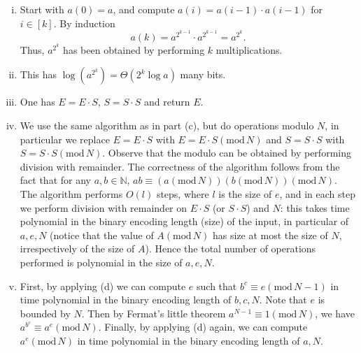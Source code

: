 \documentclass[11pt]{article}
\newcommand{\setN}{\mathbb{N}}
\begin{document}
\begin{enumerate}[1)]
\begin{solution}
\begin{enumerate}[i)]
\item Start with $a(0) = a$, and compute $a(i) = a(i− 1)· a(i− 1)$ for $i ∈ [k]$. By induction
$$a(k) = a^{2^{k−1}}· a^{2^{k−1}} = a^{2^k}.$$
Thus, $a^{2^k}$ has been obtained by performing $k$ multiplications.
\item  This has $\log(a^{2^k}) = Θ(2^k \log a)$ many bits.
\item One has $E = E\cdot S$, $S = S\cdot S$ and return $E$.
\item We use the same algorithm as in part (c), but do operations modulo $N$, in particular we replace $E
= E\cdot S$ with $E = E\cdot S (\text{mod}\, N)$ and $S = S\cdot S$ with $S = S\cdot S (\text{mod}\, N)$. Observe that the modulo can be obtained by performing division with remainder. 
The correctness of the algorithm follows from the fact that for any $a, b ∈ \setN$, $ab ≡ (a (\text{mod}\, N))(b (\text{mod}\, N)) (\text{mod}\, N)$. The algorithm performs
$O(l)$ steps, where $l$ is the size of $e$, and in each step we perform division with remainder on
$E \cdot S$ (or $S \cdot S$) and $N$: this takes time polynomial in the binary encoding length (size) of the
input, in particular of $a, e, N$ (notice that the value of $A (\text{mod}\, N)$ has size at most the size of $N$,
irrespectively of the size of $A$). Hence the total number of operations performed is polynomial
in the size of $a, e, N$.
\item  

First, by applying (d) we can compute $e$ such that $b^c \equiv e (\text{mod}\, N-1)$ in time polynomial in the binary encoding length of $b,c,N$. 
Note that $e$ is bounded by $N$. Then by Fermat's little theorem $a^{N-1}\equiv 1 (\text{mod}\, N)$, we have $a^{b^c} \equiv a^e (\text{mod}\, N)$.
Finally, by applying (d) again, we can compute $a^e (\text{mod}\, N)$ in time polynomial in the binary encoding length of $a, N$.

\end{enumerate}
\end{solution}



\end{enumerate}
\end{document}
